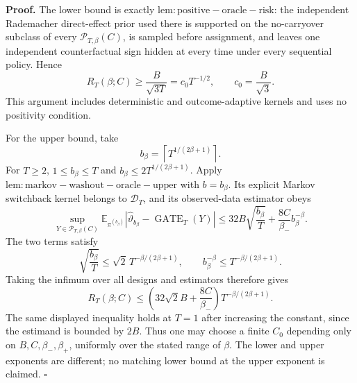\textbf{Proof.} The lower bound is exactly \(\mathrm{lem:positive-oracle-risk}\): the independent Rademacher direct-effect prior used there is supported on the no-carryover subclass of every \(\mathcal P_{T,\beta}(C)\), is sampled before assignment, and leaves one independent counterfactual sign hidden at every time under every sequential policy. Hence
\[
R_T(\beta;C)\ge \frac{B}{\sqrt{3T}}=c_0T^{-1/2},
\qquad c_0=\frac{B}{\sqrt3}.
\]
This argument includes deterministic and outcome-adaptive kernels and uses no positivity condition.

For the upper bound, take
\[
b_\beta=\left\lceil T^{1/(2\beta+1)}\right\rceil .
\]
For \(T\ge2\), \(1\le b_\beta\le T\) and \(b_\beta\le2T^{1/(2\beta+1)}\). Apply \(\mathrm{lem:markov-washout-oracle-upper}\) with \(b=b_\beta\). Its explicit Markov switchback kernel belongs to \(\mathcal D_T\), and its observed-data estimator obeys
\[
\sup_{Y\in\mathcal P_{T,\beta}(C)}
\mathbb E_{\pi^{(b_\beta)}}
\left|\widehat\vartheta_{b_\beta}-\operatorname{GATE}_T(Y)\right|
\le 32B\sqrt{\frac{b_\beta}{T}}
+\frac{8C}{\beta_-}b_\beta^{-\beta}.
\]
The two terms satisfy
\[
\sqrt{\frac{b_\beta}{T}}
\le \sqrt2\,T^{-\beta/(2\beta+1)},
\qquad
b_\beta^{-\beta}\le T^{-\beta/(2\beta+1)}.
\]
Taking the infimum over all designs and estimators therefore gives
\[
R_T(\beta;C)
\le \left(32\sqrt2 B+\frac{8C}{\beta_-}\right)
T^{-\beta/(2\beta+1)}.
\]
The same displayed inequality holds at \(T=1\) after increasing the constant, since the estimand is bounded by \(2B\). Thus one may choose a finite \(C_0\) depending only on \(B,C,\beta_-,\beta_+\), uniformly over the stated range of \(\beta\). The lower and upper exponents are different; no matching lower bound at the upper exponent is claimed. \(\square\)